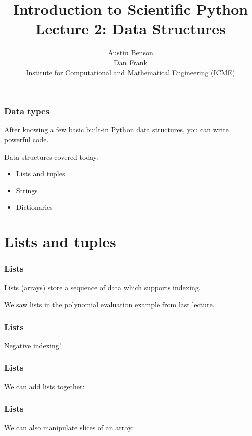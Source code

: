 \documentclass{beamer}
\title{Introduction to Scientific Python \\
Lecture 2: Data Structures}
\author{Austin Benson \\
\vspace{0.1in}
Dan Frank \\
\vspace{0.1in}
Institute for Computational and Mathematical Engineering (ICME)}
\begin{document}
\maketitle

\begin{frame}
\frametitle{Data types}

After knowing a few basic built-in Python data structures, you can write powerful code.

\vspace{0.1in}

Data structures covered today:
\begin{itemize}
\setlength{\itemsep}{0.1in}
\item{Lists and tuples}
\item{Strings}
\item{Dictionaries}
\end{itemize}

\end{frame}

\section{Lists and tuples}

\begin{frame}
\frametitle{Lists}

Lists (arrays) store a sequence of data which supports indexing.

\vspace{0.1in}

We saw lists in the polynomial evaluation example from last lecture.

\end{frame}

\begin{frame}
\frametitle{Lists}


Negative indexing!

\end{frame}

\begin{frame}
\frametitle{Lists}

We can add lists together:

\end{frame}

\begin{frame}
\frametitle{Lists}
We can also manipulate slices of an array:


\end{frame}
\end{document}
